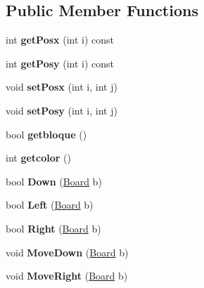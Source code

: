 \subsection*{Public Member Functions}
\begin{DoxyCompactItemize}
\item 
\mbox{\label{class_piece_a0af5276d26a4bb2a6a42a3dab8b4783f}} 
int {\bfseries get\+Posx} (int i) const
\item 
\mbox{\label{class_piece_a24ca14604d394b821bf89d690c6de477}} 
int {\bfseries get\+Posy} (int i) const
\item 
\mbox{\label{class_piece_a6a72e18613ea141e736c594b0440eac1}} 
void {\bfseries set\+Posx} (int i, int j)
\item 
\mbox{\label{class_piece_a4d7e79b948de16a1608d4cbf97f20b5e}} 
void {\bfseries set\+Posy} (int i, int j)
\item 
\mbox{\label{class_piece_aa5f13b2ce17fdf29dca28b0455f7b73a}} 
bool {\bfseries getbloque} ()
\item 
\mbox{\label{class_piece_a2160d48bd04821ebbab32e14728360ad}} 
int {\bfseries getcolor} ()
\item 
\mbox{\label{class_piece_ad48708c0bbee0b0a583f00e56808b1d2}} 
bool {\bfseries Down} (\hyperlink{class_board}{Board} b)
\item 
\mbox{\label{class_piece_aaef48eb5277927bcacace16aaf2d9636}} 
bool {\bfseries Left} (\hyperlink{class_board}{Board} b)
\item 
\mbox{\label{class_piece_a44d684a99ea99db740b5bfa73f37ab15}} 
bool {\bfseries Right} (\hyperlink{class_board}{Board} b)
\item 
\mbox{\label{class_piece_a44530e200e9506f7bb4668e82dd91d54}} 
void {\bfseries Move\+Down} (\hyperlink{class_board}{Board} b)
\item 
\mbox{\label{class_piece_a938328bd15662dbf8d4bd66145e20e1a}} 
void {\bfseries Move\+Right} (\hyperlink{class_board}{Board} b)

\end{DoxyCompactItemize}
